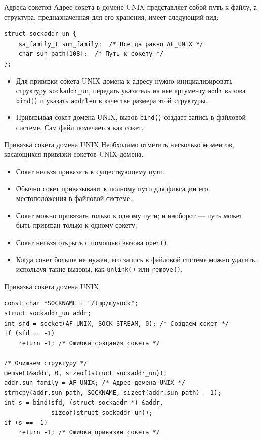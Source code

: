 \documentclass{beamer}
\begin{document}
\begin{frame}[fragile]{Адреса сокетов}
    Адрес сокета в домене UNIX представляет собой путь к файлу, а структура, предназначенная для его хранения, имеет следующий вид:
    
\begin{verbatim}
struct sockaddr_un {
    sa_family_t sun_family;  /* Всегда равно AF_UNIX */
    char sun_path[108];  /* Путь к сокету */
};
\end{verbatim}
    \begin{itemize}
    	\item Для привязки сокета UNIX-домена к адресу нужно инициализировать структуру \texttt{sockaddr\_un}, передать указатель на нее аргументу \texttt{addr} вызова \texttt{bind()} и указать \texttt{addrlen} в качестве размера этой структуры.
    	\item Привязывая сокет домена UNIX, вызов \texttt{bind()} создает запись в файловой системе.  Сам файл помечается как сокет.
    \end{itemize}    
\end{frame}

\begin{frame}{Привязка сокета домена UNIX}
    Необходимо отметить несколько моментов, касающихся привязки сокетов UNIX-домена.
    \begin{itemize}
        \item Сокет нельзя привязать к существующему пути.
        \item Обычно сокет привязывают к полному пути для фиксации его местоположения в файловой системе.
        \item Сокет можно привязать только к одному пути; и наоборот — путь может быть привязан только к одному сокету.
        \item Сокет нельзя открыть с помощью вызова \texttt{open()}.
        \item Когда сокет больше не нужен, его запись в файловой системе можно удалить, используя такие вызовы, как \texttt{unlink()} или \texttt{remove()}.
    \end{itemize}
\end{frame}

\begin{frame}[fragile]{Привязка сокета домена UNIX}
\begin{verbatim}
const char *SOCKNAME = "/tmp/mysock";
struct sockaddr_un addr;
int sfd = socket(AF_UNIX, SOCK_STREAM, 0); /* Создаем сокет */
if (sfd == -1)
    return -1; /* Ошибка создания сокета */

/* Очищаем структуру */
memset(&addr, 0, sizeof(struct sockaddr_un));
addr.sun_family = AF_UNIX; /* Адрес домена UNIX */
strncpy(addr.sun_path, SOCKNAME, sizeof(addr.sun_path) - 1);
int s = bind(sfd, (struct sockaddr *) &addr, 
             sizeof(struct sockaddr_un));
if (s == -1)
    return -1; /* Ошибка привязки сокета */
\end{verbatim}
\end{frame}
\end{document}
